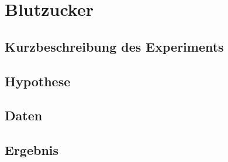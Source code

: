 \section{Blutzucker}

\subsection{Kurzbeschreibung des Experiments}

\subsection{Hypothese}

\subsection{Daten}

\subsection{Ergebnis}

